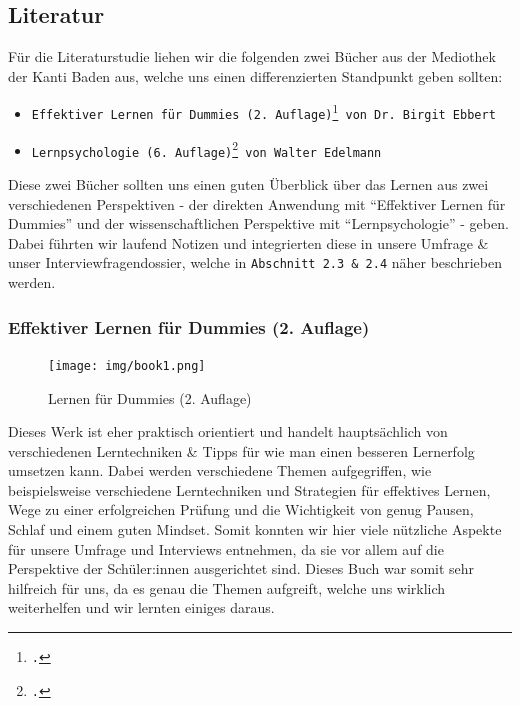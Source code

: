 \documentclass[12pt,a4paper]{report}
\begin{document}
\subsection{Literatur}
Für die Literaturstudie liehen wir die folgenden zwei Bücher aus der Mediothek der Kanti Baden aus, welche uns einen differenzierten Standpunkt geben sollten:
\begin{itemize}{}
    \item \texttt{Effektiver Lernen für Dummies (2. Auflage)\footcite{Book1} von Dr. Birgit Ebbert}
    \item \texttt{Lernpsychologie (6. Auflage)\footcite{Book2} von Walter Edelmann}
    
\end{itemize}
Diese zwei Bücher sollten uns einen guten Überblick über das Lernen aus zwei verschiedenen Perspektiven - der direkten Anwendung mit \enquote{Effektiver Lernen für Dummies} und der wissenschaftlichen Perspektive mit \enquote{Lernpsychologie} - geben. 
Dabei führten wir laufend Notizen und integrierten diese in unsere Umfrage \& unser Interviewfragendossier, welche in \texttt{Abschnitt 2.3 \& 2.4} näher beschrieben werden.

\subsubsection{Effektiver Lernen für Dummies (2. Auflage)}
\begin{figure}[H]
    \centering
    \texttt{[image: img/book1.png]}
    \caption{Lernen für Dummies (2. Auflage)}
\end{figure}

Dieses Werk ist eher praktisch orientiert und handelt hauptsächlich von verschiedenen Lerntechniken \& Tipps für wie man einen besseren Lernerfolg umsetzen kann. 
Dabei werden verschiedene Themen aufgegriffen, wie beispielsweise verschiedene Lerntechniken und Strategien für effektives Lernen, Wege zu einer erfolgreichen Prüfung und die Wichtigkeit von genug Pausen, Schlaf und einem guten Mindset.
Somit konnten wir hier viele nützliche Aspekte für unsere Umfrage und Interviews entnehmen, da sie vor allem auf die Perspektive der Schüler:innen ausgerichtet sind. 
Dieses Buch war somit sehr hilfreich für uns, da es genau die Themen aufgreift, welche uns wirklich weiterhelfen und wir lernten einiges daraus.
\end{document}
